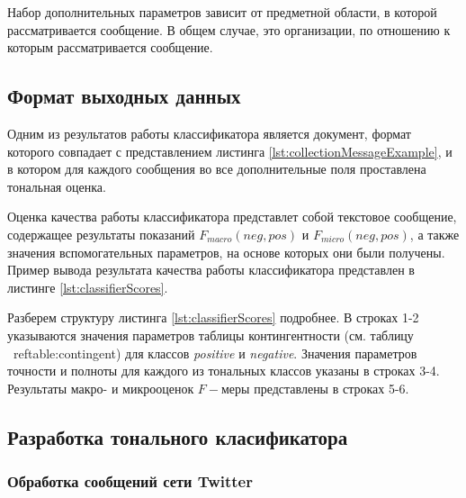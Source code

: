     Набор дополнительных параметров зависит от предметной области, в которой
    рассматривается сообщение. В общем случае, это организации, по отношению к
    которым рассматривается сообщение.

    \subsection{Формат выходных данных}
    Одним из результатов работы классификатора является \xml
    документ, формат которого совпадает с представлением листинга \ref{lst:collectionMessageExample},
    и в котором для каждого сообщения во все дополнительные поля проставлена
    тональная оценка.

    Оценка качества работы классификатора представлет собой текстовое сообщение,
    содержащее результаты показаний  $F_{macro}(neg, pos)$ и $F_{micro}(neg, pos)$,
    а также значения вспомогательных параметров, на основе которых они были
    получены. Пример вывода результата качества работы классификатора представлен
    в листинге \ref{lst:classifierScores}.

    \lstset{style=bash, numbers=left}
    

    Разберем структуру листинга \ref{lst:classifierScores} подробнее. В строках 1-2
    указываются значения параметров таблицы контингентности (см. таблицу \
    ref{table:contingent}) для классов {\it positive} и {\it negative}. Значения параметров точности и
    полноты для каждого из тональных классов указаны в строках 3-4. Результаты
    макро- и микрооценок $F-$меры представлены в строках 5-6.

    \subsection{Разработка тонального класификатора}
        \subsubsection{Обработка сообщений сети Twitter}

